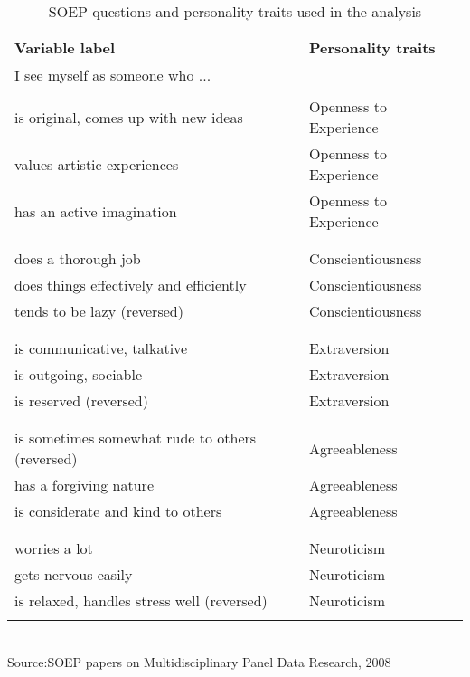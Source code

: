 \documentclass[11pt, a4paper, leqno]{article}
\begin{document}
\begin{table}[h!]
\centering
\caption{SOEP questions and personality traits used in the analysis }
\vspace{1mm}
\label{Table:A1}

\begin{tabular}{ ||p{7cm}|p{5cm}||  }
 \hline
 Variable label    & Personality traits \\
 \hline
 I see myself as someone who ...&\\
 \hline
 &\\
 is original, comes up with new ideas  &Openness to Experience  \\
 values artistic experiences&Openness to Experience\\
 has an active imagination&Openness to Experience\\
 &\\
 \hline
 &\\
 does a thorough job&   Conscientiousness \\
 does things effectively and efficiently &Conscientiousness \\
 tends to be lazy (reversed) &Conscientiousness   \\
 &\\
\hline
&\\
 is communicative, talkative&   Extraversion \\
 is outgoing, sociable& Extraversion \\
 is reserved (reversed)& Extraversion \\
 &\\
 \hline
 &\\
 is sometimes somewhat rude to others (reversed)&Agreeableness\\
 has a forgiving nature&Agreeableness \\
 is considerate and kind to others&Agreeableness \\
 &\\
 \hline
 &\\
 worries a lot&Neuroticism\\
 gets nervous easily&Neuroticism \\
 is relaxed, handles stress well (reversed)& Neuroticism\\
 &\\
 \hline
\end{tabular}
\end{table}
\\
\footnotesize{Source:SOEP papers on Multidisciplinary Panel Data Research, 2008}
\end{document}
